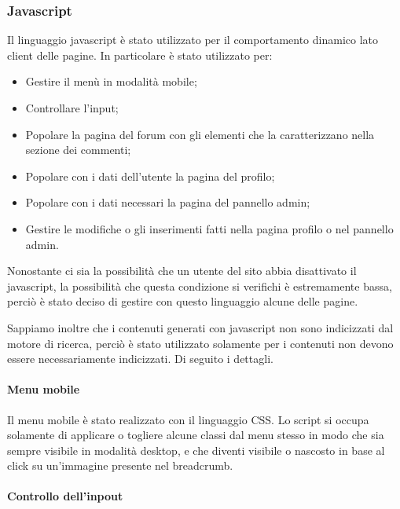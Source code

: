 \subsubsection{Javascript}\label{subs:js}

Il linguaggio javascript è stato utilizzato per il comportamento dinamico lato client delle pagine. In particolare è stato utilizzato per: 

\begin{itemize}
    
	\item Gestire il menù in modalità mobile;
    \item Controllare l'input;
	\item Popolare la pagina del forum con gli elementi che la caratterizzano nella sezione dei commenti;
	\item Popolare con i dati dell'utente la pagina del profilo;
	\item Popolare con i dati necessari la pagina del pannello admin;
	\item Gestire le modifiche o gli inserimenti fatti nella pagina profilo o nel pannello admin.
\end{itemize}

Nonostante ci sia la possibilità che un utente del sito abbia disattivato il javascript, la possibilità che questa condizione si verifichi è estremamente bassa, perciò è stato deciso di gestire con questo linguaggio alcune delle pagine. 

Sappiamo inoltre che i contenuti generati con javascript non sono indicizzati dal motore di ricerca, perciò è stato utilizzato solamente per i contenuti non devono essere necessariamente indicizzati. Di seguito i dettagli.

\paragraph{Menu mobile} %

Il menu mobile è stato realizzato con il linguaggio CSS. Lo script si occupa solamente di applicare o togliere alcune classi dal menu stesso in modo che sia sempre visibile in modalità desktop, e che diventi visibile o nascosto in base al click su un'immagine 
presente nel breadcrumb.

\paragraph{Controllo dell'inpout}

